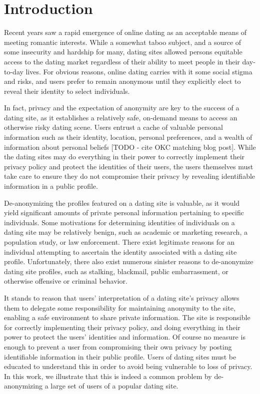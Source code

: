 \section{Introduction}
\label{sec:intro}

Recent years saw a rapid emergence of online dating as an acceptable means of meeting romantic interests.
While a somewhat taboo subject, and a source of some insecurity and hardship for many, dating sites allowed persons equitable access to the dating market regardless of their ability to meet people in their day-to-day lives.
For obvious reasons, online dating carries with it some social stigma and risks, and users prefer to remain anonymous until they explicitly elect to reveal their identity to select individuals.

In fact, privacy and the expectation of anonymity are key to the success of a dating site, as it establishes a relatively safe, on-demand means to access an otherwise risky dating scene.
Users entrust a cache of valuable personal information such as their identity, location, personal preferences, and a wealth of information about personal beliefs [TODO - cite OKC matching blog post].
While the dating sites may do everything in their power to correctly implement their privacy policy and protect the identities of their users, the users themselves must take care to ensure they do not compromise their privacy by revealing identifiable information in a public profile.

De-anonymizing the profiles featured on a dating site is valuable, as it would yield significant amounts of private personal information pertaining to specific individuals.
Some motivations for determining identities of individuals on a dating site may be relatively benign, such as academic or marketing research, a population study, or law enforcement.
There exist legitimate reasons for an individual attempting to ascertain the identity associated with a dating site profile.
Unfortunately, there also exist numerous sinister reasons to de-anonymize dating site profiles, such as stalking, blackmail, public embarrassment, or otherwise offensive or criminal behavior.

It stands to reason that users' interpretation of a dating site's privacy allows them to delegate some responsibility for maintaining anonymity to the site, enabling a safe environment to share private information.
The site is responsible for correctly implementing their privacy policy, and doing everything in their power to protect the users' identities and information.
Of course no measure is enough to prevent a user from compromising their own privacy by posting identifiable information in their public profile.
Users of dating sites must be educated to understand this in order to avoid being vulnerable to loss of privacy.
In this work, we illustrate that this is indeed a common problem by de-anonymizing a large set of users of a popular dating site.

